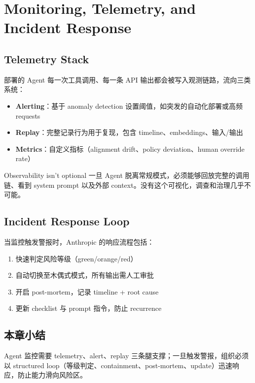 \section{Monitoring, Telemetry, and Incident Response}

\subsection{Telemetry Stack}

部署的 Agent 每一次工具调用、每一条 API 输出都会被写入观测链路，流向三类系统：

\begin{itemize}
    \item \textbf{Alerting}：基于 anomaly detection 设置阈值，如突发的自动化部署或高频 requests
    \item \textbf{Replay}：完整记录行为用于复现，包含 timeline、embeddings、输入/输出
    \item \textbf{Metrics}：自定义指标（alignment drift、policy deviation、human override rate）
\end{itemize}

\begin{warningbox}{Observability isn't optional}
一旦 Agent 脱离常规模式，必须能够回放完整的调用链、看到 system prompt 以及外部 context。没有这个可视化，调查和治理几乎不可能。
\end{warningbox}

\subsection{Incident Response Loop}

当监控触发警报时，Anthropic 的响应流程包括：

\begin{enumerate}
    \item 快速判定风险等级（green/orange/red）
    \item 自动切换至木偶式模式，所有输出需人工审批
    \item 开启 post-mortem，记录 timeline + root cause
    \item 更新 checklist 与 prompt 指令，防止 recurrence
\end{enumerate}

\subsection{本章小结}

Agent 监控需要 telemetry、alert、replay 三条腿支撑；一旦触发警报，组织必须以 structured loop（等级判定、containment、post-mortem、update）迅速响应，防止能力滑向风险区。

